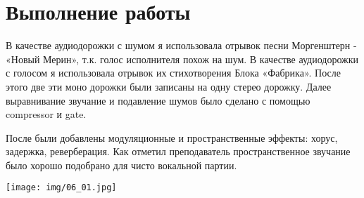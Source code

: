 \section{Выполнение работы}

В качестве аудиодорожки с шумом я использовала отрывок песни Моргенштерн - «Новый Мерин», т.к. голос исполнителя похож на шум. В качестве аудиодорожки с голосом я использовала отрывок их стихотворения Блока «Фабрика».
После этого две эти моно дорожки были записаны на одну стерео дорожку. Далее выравнивание звучание и подавление шумов было сделано с помощью compressor и gate.

После были добавлены модуляционные и пространственные эффекты: хорус, задержка, реверберация. Как отметил преподаватель пространственное звучание было хорошо подобрано для чисто вокальной партии.


\texttt{[image: img/06\_01.jpg]}\\



\pagebreak

